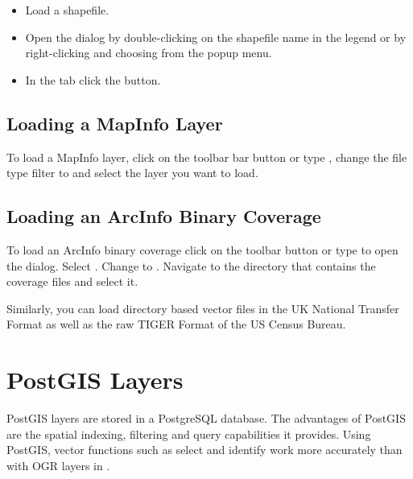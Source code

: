 \begin{itemize}[label=--]
\item Load a shapefile.
\item Open the  dialog by double-clicking on the
shapefile name in the legend or by right-clicking and choosing
 from the popup menu.
\item In the tab  click the  button.
\end{itemize}

\subsection{Loading a MapInfo Layer}

To load a MapInfo layer, click on the  toolbar bar button or type , change the
file type filter to  and select the layer you want to load.

\subsection{Loading an ArcInfo Binary Coverage}

To load an ArcInfo binary coverage click on the
 toolbar button or type
 to open the  dialog. Select
. Change to . 
Navigate to the directory that contains the coverage files and select it.

Similarly, you can load directory based  vector files in the UK National Transfer Format as well as the 
raw TIGER Format of the US Census Bureau.

\section{PostGIS Layers}
\label{label_postgis} 

PostGIS layers are stored in a PostgreSQL database. The advantages of PostGIS
are the spatial indexing, filtering and query capabilities it provides. Using PostGIS,
vector functions such as select and identify work more accurately than with
OGR layers in \qg.

